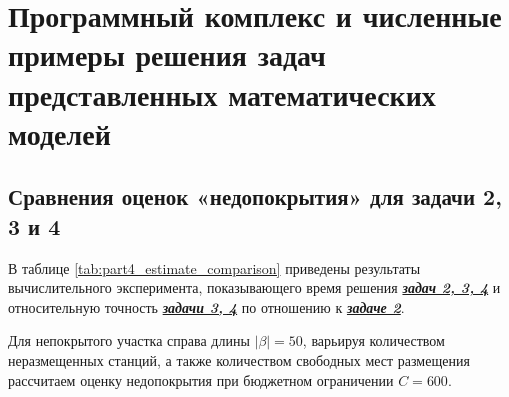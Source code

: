 \chapter{Программный комплекс и численные примеры решения задач представленных математических моделей}\label{part4}

\section{Сравнения оценок «недопокрытия» для задачи 2, 3 и 4}\label{part4:task_234}

В таблице \cref{tab:part4_estimate_comparison} приведены результаты вычислительного эксперимента, показывающего время решения \underline{\textit{\textbf{задач 2, 3, 4}}} и относительную точность \underline{\textit{\textbf{задачи 3, 4}}} по отношению к \underline{\textit{\textbf{задаче 2}}}.

Для непокрытого участка справа длины $|\beta| = 50$, варьируя количеством неразмещенных станций, а также количеством свободных мест размещения рассчитаем оценку недопокрытия при бюджетном ограничении $C=600$.




